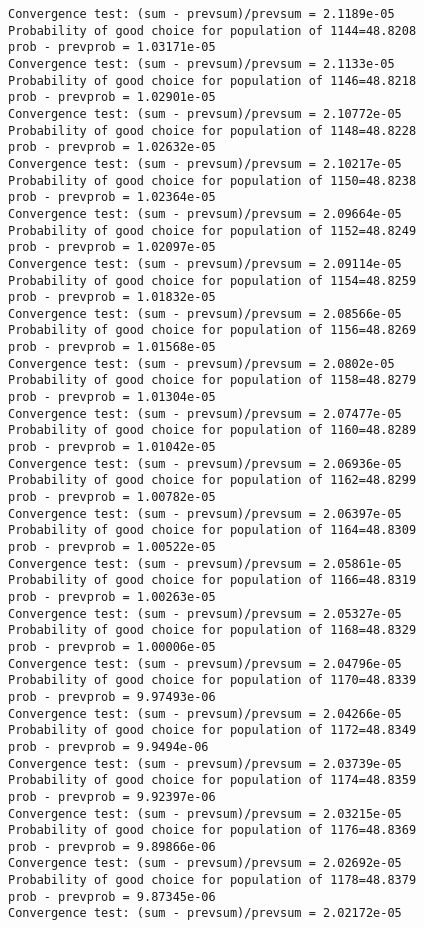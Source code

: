 \documentclass[11pt,onecolumn]{article}
\begin{document}
\begin{verbatim}
Convergence test: (sum - prevsum)/prevsum = 2.1189e-05
Probability of good choice for population of 1144=48.8208
prob - prevprob = 1.03171e-05
Convergence test: (sum - prevsum)/prevsum = 2.1133e-05
Probability of good choice for population of 1146=48.8218
prob - prevprob = 1.02901e-05
Convergence test: (sum - prevsum)/prevsum = 2.10772e-05
Probability of good choice for population of 1148=48.8228
prob - prevprob = 1.02632e-05
Convergence test: (sum - prevsum)/prevsum = 2.10217e-05
Probability of good choice for population of 1150=48.8238
prob - prevprob = 1.02364e-05
Convergence test: (sum - prevsum)/prevsum = 2.09664e-05
Probability of good choice for population of 1152=48.8249
prob - prevprob = 1.02097e-05
Convergence test: (sum - prevsum)/prevsum = 2.09114e-05
Probability of good choice for population of 1154=48.8259
prob - prevprob = 1.01832e-05
Convergence test: (sum - prevsum)/prevsum = 2.08566e-05
Probability of good choice for population of 1156=48.8269
prob - prevprob = 1.01568e-05
Convergence test: (sum - prevsum)/prevsum = 2.0802e-05
Probability of good choice for population of 1158=48.8279
prob - prevprob = 1.01304e-05
Convergence test: (sum - prevsum)/prevsum = 2.07477e-05
Probability of good choice for population of 1160=48.8289
prob - prevprob = 1.01042e-05
Convergence test: (sum - prevsum)/prevsum = 2.06936e-05
Probability of good choice for population of 1162=48.8299
prob - prevprob = 1.00782e-05
Convergence test: (sum - prevsum)/prevsum = 2.06397e-05
Probability of good choice for population of 1164=48.8309
prob - prevprob = 1.00522e-05
Convergence test: (sum - prevsum)/prevsum = 2.05861e-05
Probability of good choice for population of 1166=48.8319
prob - prevprob = 1.00263e-05
Convergence test: (sum - prevsum)/prevsum = 2.05327e-05
Probability of good choice for population of 1168=48.8329
prob - prevprob = 1.00006e-05
Convergence test: (sum - prevsum)/prevsum = 2.04796e-05
Probability of good choice for population of 1170=48.8339
prob - prevprob = 9.97493e-06
Convergence test: (sum - prevsum)/prevsum = 2.04266e-05
Probability of good choice for population of 1172=48.8349
prob - prevprob = 9.9494e-06
Convergence test: (sum - prevsum)/prevsum = 2.03739e-05
Probability of good choice for population of 1174=48.8359
prob - prevprob = 9.92397e-06
Convergence test: (sum - prevsum)/prevsum = 2.03215e-05
Probability of good choice for population of 1176=48.8369
prob - prevprob = 9.89866e-06
Convergence test: (sum - prevsum)/prevsum = 2.02692e-05
Probability of good choice for population of 1178=48.8379
prob - prevprob = 9.87345e-06
Convergence test: (sum - prevsum)/prevsum = 2.02172e-05

\end{verbatim}
\end{document}
